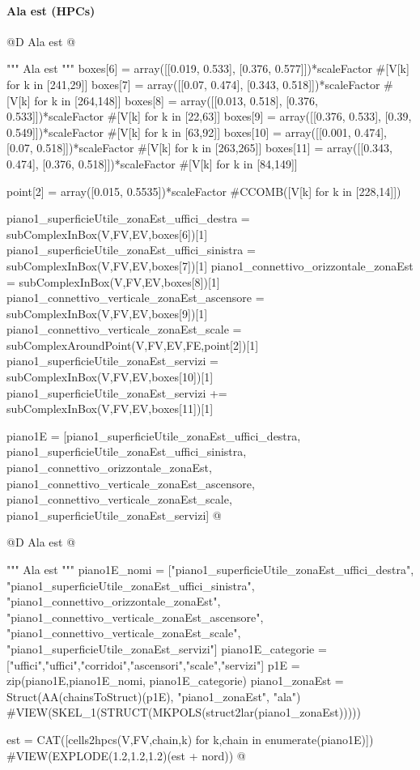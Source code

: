 \documentclass[11pt,oneside]{article}    %
\begin{document}
\paragraph{Ala est (HPCs)}
@D Ala est
@{""" Ala est """
boxes[6] = array([[0.019, 0.533], [0.376, 0.577]])*scaleFactor #[V[k] for k in [241,29]]
boxes[7] = array([[0.07, 0.474], [0.343, 0.518]])*scaleFactor #[V[k] for k in [264,148]]
boxes[8] = array([[0.013, 0.518], [0.376, 0.533]])*scaleFactor #[V[k] for k in [22,63]]
boxes[9] = array([[0.376, 0.533], [0.39, 0.549]])*scaleFactor #[V[k] for k in [63,92]]
boxes[10] = array([[0.001, 0.474], [0.07, 0.518]])*scaleFactor #[V[k] for k in [263,265]]
boxes[11] = array([[0.343, 0.474], [0.376, 0.518]])*scaleFactor #[V[k] for k in [84,149]]

point[2] = array([0.015, 0.5535])*scaleFactor #CCOMB([V[k] for k in [228,14]])

piano1_superficieUtile_zonaEst_uffici_destra = subComplexInBox(V,FV,EV,boxes[6])[1]
piano1_superficieUtile_zonaEst_uffici_sinistra = subComplexInBox(V,FV,EV,boxes[7])[1]
piano1_connettivo_orizzontale_zonaEst = subComplexInBox(V,FV,EV,boxes[8])[1]
piano1_connettivo_verticale_zonaEst_ascensore = subComplexInBox(V,FV,EV,boxes[9])[1]
piano1_connettivo_verticale_zonaEst_scale = subComplexAroundPoint(V,FV,EV,FE,point[2])[1]
piano1_superficieUtile_zonaEst_servizi = subComplexInBox(V,FV,EV,boxes[10])[1]
piano1_superficieUtile_zonaEst_servizi += subComplexInBox(V,FV,EV,boxes[11])[1]

piano1E = [piano1_superficieUtile_zonaEst_uffici_destra, piano1_superficieUtile_zonaEst_uffici_sinistra, piano1_connettivo_orizzontale_zonaEst, piano1_connettivo_verticale_zonaEst_ascensore, piano1_connettivo_verticale_zonaEst_scale, piano1_superficieUtile_zonaEst_servizi]
@}
@D Ala est
@{""" Ala est """
piano1E_nomi = ["piano1_superficieUtile_zonaEst_uffici_destra", "piano1_superficieUtile_zonaEst_uffici_sinistra", "piano1_connettivo_orizzontale_zonaEst", "piano1_connettivo_verticale_zonaEst_ascensore", "piano1_connettivo_verticale_zonaEst_scale", "piano1_superficieUtile_zonaEst_servizi"]
piano1E_categorie = ["uffici","uffici","corridoi","ascensori","scale","servizi"]
p1E = zip(piano1E,piano1E_nomi, piano1E_categorie)
piano1_zonaEst = Struct(AA(chainsToStruct)(p1E), "piano1_zonaEst", "ala")
#VIEW(SKEL_1(STRUCT(MKPOLS(struct2lar(piano1_zonaEst)))))

est = CAT([cells2hpcs(V,FV,chain,k) for k,chain in enumerate(piano1E)])
#VIEW(EXPLODE(1.2,1.2,1.2)(est + nord))
@}
\end{document}
